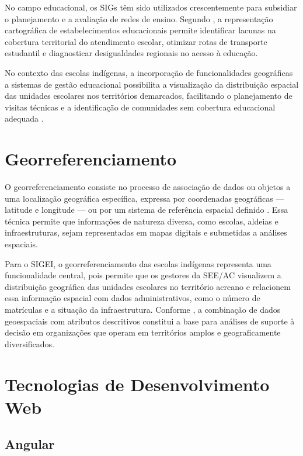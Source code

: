 \documentclass[12pt,a4paper,oneside]{abntspiifac}
\begin{document}
No campo educacional, os SIGs têm sido utilizados crescentemente para subsidiar o planejamento e a avaliação de redes de ensino. Segundo , a representação cartográfica de estabelecimentos educacionais permite identificar lacunas na cobertura territorial do atendimento escolar, otimizar rotas de transporte estudantil e diagnosticar desigualdades regionais no acesso à educação.

No contexto das escolas indígenas, a incorporação de funcionalidades geográficas a sistemas de gestão educacional possibilita a visualização da distribuição espacial das unidades escolares nos territórios demarcados, facilitando o planejamento de visitas técnicas e a identificação de comunidades sem cobertura educacional adequada \cite{camara2001}.

\section{Georreferenciamento}

O georreferenciamento consiste no processo de associação de dados ou objetos a uma localização geográfica específica, expressa por coordenadas geográficas — latitude e longitude — ou por um sistema de referência espacial definido \cite{moura2003}. Essa técnica permite que informações de natureza diversa, como escolas, aldeias e infraestruturas, sejam representadas em mapas digitais e submetidas a análises espaciais.

Para o SIGEI, o georreferenciamento das escolas indígenas representa uma funcionalidade central, pois permite que os gestores da SEE/AC visualizem a distribuição geográfica das unidades escolares no território acreano e relacionem essa informação espacial com dados administrativos, como o número de matrículas e a situação da infraestrutura. Conforme , a combinação de dados geoespaciais com atributos descritivos constitui a base para análises de suporte à decisão em organizações que operam em territórios amplos e geograficamente diversificados.

\section{Tecnologias de Desenvolvimento Web}

\subsection{Angular}
\end{document}
